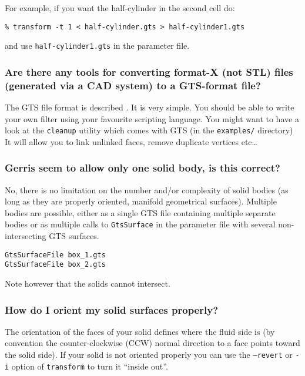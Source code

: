 \documentclass[a4paper]{article}
\begin{document}
For example, if you want the half-cylinder in the second cell do:
\begin{verbatim}
% transform -t 1 < half-cylinder.gts > half-cylinder1.gts
\end{verbatim}
and use {\tt half-cylinder1.gts} in the parameter file.

\subsubsection{Are there any tools for converting format-X (not STL) files 
(generated via a CAD system) to a GTS-format file?}

The GTS file format is described .
It is very simple. You should be able to write your own filter
using your favourite scripting language. You might want to have a look 
at the {\tt cleanup} utility which comes with GTS (in the {\tt examples/} 
directory) It will allow you to link unlinked faces, remove duplicate
vertices etc\dots

\subsubsection{Gerris seem to allow only one solid body, is this correct?}

No, there is no limitation on the number and/or complexity of solid
bodies (as long as they are properly oriented, manifold geometrical
surfaces). Multiple bodies are possible, either as a single GTS file
containing multiple separate bodies or as multiple calls to
{\tt GtsSurface} in the parameter file with several non-intersecting GTS
surfaces.
\begin{verbatim}
GtsSurfaceFile box_1.gts
GtsSurfaceFile box_2.gts
\end{verbatim}
Note however that the solids cannot intersect.

\subsubsection{How do I orient my solid surfaces properly?}

The orientation of the
faces of your solid defines where the fluid side is (by
convention the counter-clockwise (CCW) normal direction to a face points toward the solid
side). If your solid is not oriented properly you can use the
{\tt --revert} or {\tt -i} option of {\tt transform} to turn it ``inside out''.
\end{document}
